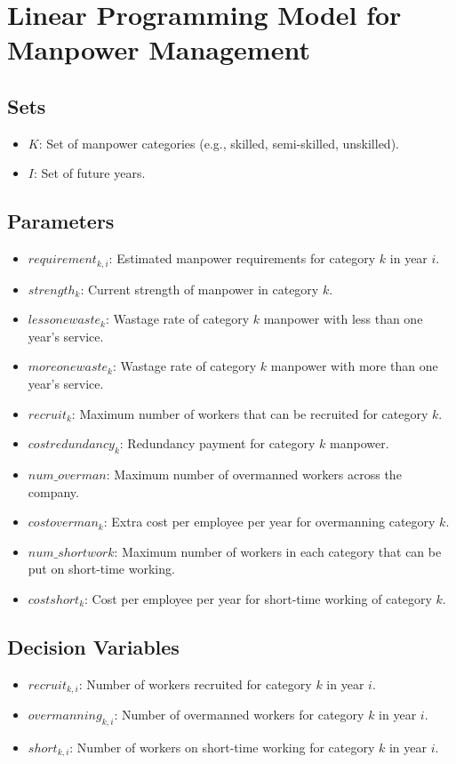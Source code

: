 \documentclass{article}
\begin{document}
\section*{Linear Programming Model for Manpower Management}

\subsection*{Sets}
\begin{itemize}
    \item $K$: Set of manpower categories (e.g., skilled, semi-skilled, unskilled).
    \item $I$: Set of future years.
\end{itemize}

\subsection*{Parameters}
\begin{itemize}
    \item $requirement_{k,i}$: Estimated manpower requirements for category $k$ in year $i$.
    \item $strength_{k}$: Current strength of manpower in category $k$.
    \item $lessonewaste_{k}$: Wastage rate of category $k$ manpower with less than one year's service.
    \item $moreonewaste_{k}$: Wastage rate of category $k$ manpower with more than one year's service.
    \item $recruit_{k}$: Maximum number of workers that can be recruited for category $k$.
    \item $costredundancy_{k}$: Redundancy payment for category $k$ manpower.
    \item $num\_overman$: Maximum number of overmanned workers across the company.
    \item $costoverman_{k}$: Extra cost per employee per year for overmanning category $k$.
    \item $num\_shortwork$: Maximum number of workers in each category that can be put on short-time working.
    \item $costshort_{k}$: Cost per employee per year for short-time working of category $k$.
\end{itemize}

\subsection*{Decision Variables}
\begin{itemize}
    \item $recruit_{k,i}$: Number of workers recruited for category $k$ in year $i$.
    \item $overmanning_{k,i}$: Number of overmanned workers for category $k$ in year $i$.
    \item $short_{k,i}$: Number of workers on short-time working for category $k$ in year $i$.
\end{itemize}
\end{document}
